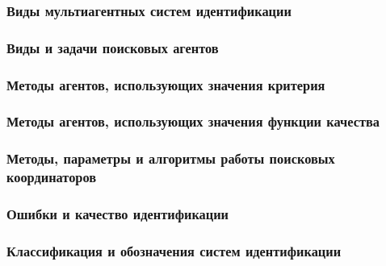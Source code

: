 \documentclass[10pt,utf8]{beamer}
\begin{document}
\begin{frame}
  \frametitle{Виды мультиагентных систем идентификации}


\end{frame}




\begin{frame}
  \frametitle{Виды и задачи поисковых агентов}


\end{frame}




\begin{frame}
  \frametitle{Методы агентов, использующих значения критерия}


\end{frame}



\begin{frame}
  \frametitle{Методы агентов, использующих значения функции качества}


\end{frame}





\begin{frame}
  \frametitle{Методы, параметры и алгоритмы работы поисковых координаторов }


\end{frame}




\begin{frame}
  \frametitle{Ошибки и качество идентификации}


\end{frame}






\begin{frame}
  \frametitle{Классификация и обозначения систем идентификации}


\end{frame}
\end{document}
